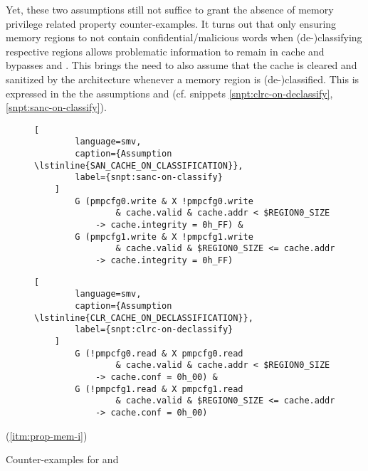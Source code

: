 Yet, these two assumptions still not suffice to grant the absence of memory privilege related property counter-examples.
It turns out that only ensuring memory regions to not contain confidential/malicious words when (de-)classifying respective regions allows problematic information to remain in cache and bypasses  and .
This brings the need to also assume that the cache is cleared and sanitized by the architecture whenever a memory region is (de-)classified.
This is expressed in the the assumptions  and  (cf. snippets \ref{snpt:clrc-on-declassify}, \ref{snpt:sanc-on-classify}).

\begin{figure}
    \begin{lstlisting}[
        language=smv,
        caption={Assumption \lstinline{SAN_CACHE_ON_CLASSIFICATION}},
        label={snpt:sanc-on-classify}
    ]
        G (pmpcfg0.write & X !pmpcfg0.write
                & cache.valid & cache.addr < $REGION0_SIZE
            -> cache.integrity = 0h_FF) &
        G (pmpcfg1.write & X !pmpcfg1.write
                & cache.valid & $REGION0_SIZE <= cache.addr
            -> cache.integrity = 0h_FF)
    \end{lstlisting}

    \begin{lstlisting}[
        language=smv,
        caption={Assumption \lstinline{CLR_CACHE_ON_DECLASSIFICATION}},
        label={snpt:clrc-on-declassify}
    ]
        G (!pmpcfg0.read & X pmpcfg0.read
                & cache.valid & cache.addr < $REGION0_SIZE
            -> cache.conf = 0h_00) &
        G (!pmpcfg1.read & X pmpcfg1.read
                & cache.valid & $REGION0_SIZE <= cache.addr
            -> cache.conf = 0h_00)
    \end{lstlisting}
\end{figure}

\begin{table}
    \begin{subtable}{\textwidth}
        \centering
        
        \caption{ (\ref{itm:prop-mem-i})}
        \label{tbl:cex-mem-i-scocl}
    \end{subtable}
    \caption{Counter-examples for  and }
\end{table}

